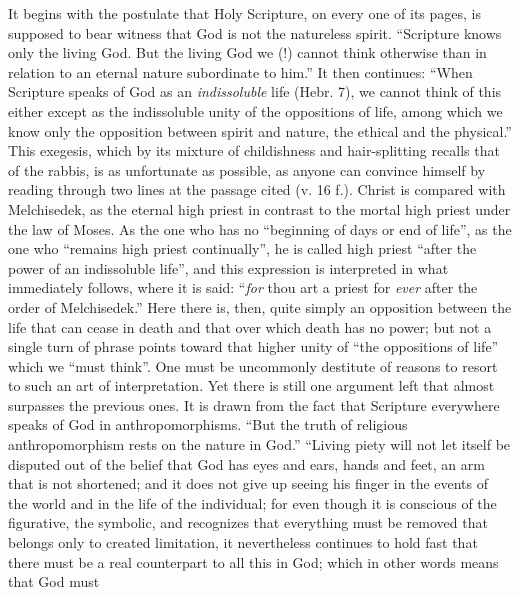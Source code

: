 \documentclass[12pt,a4paper,openany]{book}
\newcommand{\opage}[1]{\marginnote{\footnotesize\textit{[#1]}}}
\begin{document}
It begins with the postulate that Holy Scripture, on
every one of its pages, is supposed to bear witness that God is not the natureless
spirit. ``Scripture knows only the living God. But the
living God we (!) cannot think otherwise than in relation
to an eternal nature subordinate to him.'' It then continues:
``When Scripture speaks of God as an \emph{indissoluble}
life (Hebr. 7), we cannot think of this either except
as the indissoluble unity of the oppositions of life, among
which we know only the opposition between spirit and nature,
the ethical and the physical.'' This exegesis, which by its
mixture of childishness and hair-splitting recalls that of
the rabbis, is as unfortunate as possible, as anyone can
convince himself by reading through two lines at
the passage cited (v. 16 f.). Christ is compared
with Melchisedek, as the eternal high priest in contrast
to the mortal high priest under the law of Moses. As the one
who has no ``beginning of days or end of life'', as
the one who ``remains high priest continually'', he is called high priest
``after the power of an indissoluble life'', and this expression is interpreted
in what immediately follows, where it is said: ``\emph{for}
\opage{452}thou art a priest for \emph{ever} after the order of Melchisedek.'' Here
there is, then, quite simply an opposition between the life that
can cease in death and that over which death has no
power; but not a single turn of phrase points toward that
higher unity of ``the oppositions of life'' which we ``must
think''. One must be uncommonly destitute of reasons to
resort to such an art of interpretation. Yet there is still
one argument left that almost surpasses the previous ones. It
is drawn from the fact that Scripture everywhere speaks of God in anthropomorphisms.
``But the truth of religious anthropomorphism
rests on the nature in God.'' ``Living piety will not let
itself be disputed out of the belief that God has eyes and ears, hands
and feet, an arm that is not shortened; and it does not give up
seeing his finger in the events of the world and in the
life of the individual; for even though it is conscious of the figurative, the symbolic,
and recognizes that everything must be removed that
belongs only to created limitation, it nevertheless continues to
hold fast that there must be a real counterpart to all this
in God; which in other words means that God must
\end{document}
